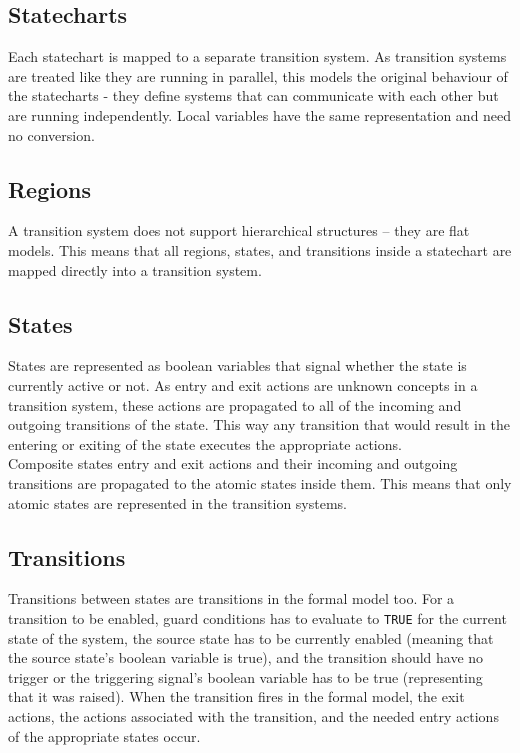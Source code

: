   \subsection{Statecharts}
Each statechart is mapped to a separate transition system. As transition systems are treated like they are running in parallel, this models the original behaviour of the statecharts - they define systems that can communicate with each other but are running independently. Local variables have the same representation and need no conversion.
  \subsection{Regions}
A transition system does not support hierarchical structures -- they are flat models. This means that all regions, states, and transitions inside a statechart are mapped directly into a transition system.
  \subsection{States}
States are represented as boolean variables that signal whether the state is currently active or not. As entry and exit actions are unknown concepts in a transition system, these actions are propagated to all of the incoming and outgoing transitions of the state. This way any transition that would result in the entering or exiting of the state executes the appropriate actions.\\
Composite states entry and exit actions and their incoming and outgoing transitions are propagated to the atomic states inside them. This means that only atomic states are represented in the transition systems.
  \subsection{Transitions}
Transitions between states are transitions in the formal model too. For a transition to be enabled, guard conditions has to evaluate to \verb!TRUE! for the current state of the system, the source state has to be currently enabled (meaning that the source state's boolean variable is true), and the transition should have no trigger or the triggering signal's boolean variable has to be true (representing that it was raised). When the transition fires in the formal model, the exit actions, the actions associated with the transition, and the needed entry actions of the appropriate states occur.  
